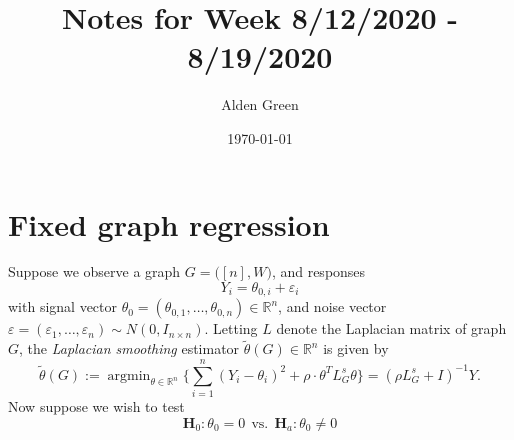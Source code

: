 \documentclass{article}
\newcommand{\Reals}{\mathbb{R}}
\newcommand{\1}{\mathbf{1}}
\DeclareMathOperator*{\argmin}{argmin}
\newcommand{\Lap}{L}
\newcommand{\Id}{I}
\newcommand{\wt}[1]{\widetilde{#1}}
\theoremstyle{alden}
\theoremstyle{aldenthm}
\theoremstyle{definition}
\theoremstyle{remark}
\begin{document}
\title{Notes for Week 8/12/2020 - 8/19/2020}
\author{Alden Green}
\date{\today}
\maketitle

\section{Fixed graph regression}

Suppose we observe a graph $G = \bigl([n],W\bigr)$, and responses
\begin{equation}
\label{eqn:fixed_graph_regression_model}
Y_i = \theta_{0,i} + \varepsilon_i
\end{equation}
with signal vector $\theta_0 = (\theta_{0,1},\ldots,\theta_{0,n}) \in \Reals^n$, and noise vector $\varepsilon = (\varepsilon_1,\ldots,\varepsilon_n) \sim N(0,\Id_{n \times n})$. Letting $L$ denote the Laplacian matrix of graph $G$, the \emph{Laplacian smoothing} estimator $\wt{\theta}(G) \in \Reals^n$ is given by
\begin{equation}
\label{eqn:ls_G}
\wt{\theta}(G) := \argmin_{\theta \in \Reals^n} \biggl\{ \sum_{i = 1}^{n}(Y_i - \theta_i)^2 + \rho \cdot \theta^T \Lap_G^{s}  \theta \biggr\} = (\rho \Lap_G^s + I)^{-1}Y.
\end{equation}
Now suppose we wish to test 
\begin{equation}
\mathbf{H}_0: \theta_0 = 0 ~~\textrm{vs.}~~ \mathbf{H}_a: \theta_0 \neq 0
\end{equation}
\end{document}
